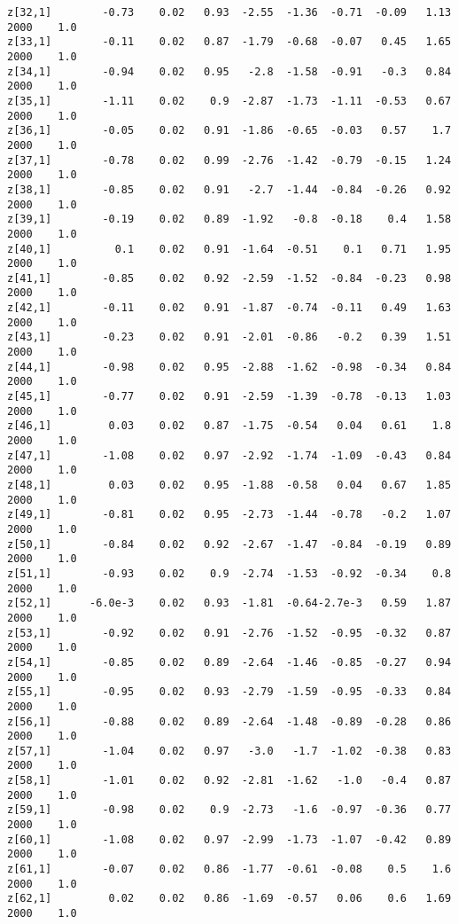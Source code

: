 \documentclass[11pt]{article}
\begin{document}
\begin{Verbatim}[commandchars=\\\{\}]
z[32,1]        -0.73    0.02   0.93  -2.55  -1.36  -0.71  -0.09   1.13   2000    1.0
z[33,1]        -0.11    0.02   0.87  -1.79  -0.68  -0.07   0.45   1.65   2000    1.0
z[34,1]        -0.94    0.02   0.95   -2.8  -1.58  -0.91   -0.3   0.84   2000    1.0
z[35,1]        -1.11    0.02    0.9  -2.87  -1.73  -1.11  -0.53   0.67   2000    1.0
z[36,1]        -0.05    0.02   0.91  -1.86  -0.65  -0.03   0.57    1.7   2000    1.0
z[37,1]        -0.78    0.02   0.99  -2.76  -1.42  -0.79  -0.15   1.24   2000    1.0
z[38,1]        -0.85    0.02   0.91   -2.7  -1.44  -0.84  -0.26   0.92   2000    1.0
z[39,1]        -0.19    0.02   0.89  -1.92   -0.8  -0.18    0.4   1.58   2000    1.0
z[40,1]          0.1    0.02   0.91  -1.64  -0.51    0.1   0.71   1.95   2000    1.0
z[41,1]        -0.85    0.02   0.92  -2.59  -1.52  -0.84  -0.23   0.98   2000    1.0
z[42,1]        -0.11    0.02   0.91  -1.87  -0.74  -0.11   0.49   1.63   2000    1.0
z[43,1]        -0.23    0.02   0.91  -2.01  -0.86   -0.2   0.39   1.51   2000    1.0
z[44,1]        -0.98    0.02   0.95  -2.88  -1.62  -0.98  -0.34   0.84   2000    1.0
z[45,1]        -0.77    0.02   0.91  -2.59  -1.39  -0.78  -0.13   1.03   2000    1.0
z[46,1]         0.03    0.02   0.87  -1.75  -0.54   0.04   0.61    1.8   2000    1.0
z[47,1]        -1.08    0.02   0.97  -2.92  -1.74  -1.09  -0.43   0.84   2000    1.0
z[48,1]         0.03    0.02   0.95  -1.88  -0.58   0.04   0.67   1.85   2000    1.0
z[49,1]        -0.81    0.02   0.95  -2.73  -1.44  -0.78   -0.2   1.07   2000    1.0
z[50,1]        -0.84    0.02   0.92  -2.67  -1.47  -0.84  -0.19   0.89   2000    1.0
z[51,1]        -0.93    0.02    0.9  -2.74  -1.53  -0.92  -0.34    0.8   2000    1.0
z[52,1]      -6.0e-3    0.02   0.93  -1.81  -0.64-2.7e-3   0.59   1.87   2000    1.0
z[53,1]        -0.92    0.02   0.91  -2.76  -1.52  -0.95  -0.32   0.87   2000    1.0
z[54,1]        -0.85    0.02   0.89  -2.64  -1.46  -0.85  -0.27   0.94   2000    1.0
z[55,1]        -0.95    0.02   0.93  -2.79  -1.59  -0.95  -0.33   0.84   2000    1.0
z[56,1]        -0.88    0.02   0.89  -2.64  -1.48  -0.89  -0.28   0.86   2000    1.0
z[57,1]        -1.04    0.02   0.97   -3.0   -1.7  -1.02  -0.38   0.83   2000    1.0
z[58,1]        -1.01    0.02   0.92  -2.81  -1.62   -1.0   -0.4   0.87   2000    1.0
z[59,1]        -0.98    0.02    0.9  -2.73   -1.6  -0.97  -0.36   0.77   2000    1.0
z[60,1]        -1.08    0.02   0.97  -2.99  -1.73  -1.07  -0.42   0.89   2000    1.0
z[61,1]        -0.07    0.02   0.86  -1.77  -0.61  -0.08    0.5    1.6   2000    1.0
z[62,1]         0.02    0.02   0.86  -1.69  -0.57   0.06    0.6   1.69   2000    1.0

\end{Verbatim}
\end{document}
